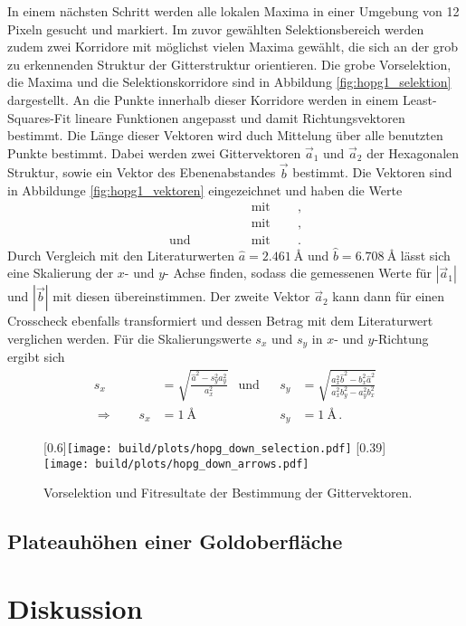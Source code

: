 In einem nächsten Schritt werden alle lokalen Maxima in einer Umgebung von
\num{12} Pixeln gesucht und markiert. Im zuvor gewählten Selektionsbereich
werden zudem zwei Korridore mit möglichst vielen Maxima gewählt, die sich an
der grob zu erkennenden Struktur der Gitterstruktur orientieren.
Die grobe Vorselektion, die Maxima und die Selektionskorridore sind in
Abbildung \ref{fig:hopg1_selektion} dargestellt.
An die Punkte innerhalb dieser Korridore werden in einem Least-Squares-Fit
lineare Funktionen angepasst und damit Richtungsvektoren bestimmt. Die Länge
dieser Vektoren wird duch Mittelung über alle benutzten Punkte bestimmt.
Dabei werden zwei Gittervektoren $\vec{a}_1$ und $\vec{a}_2$ der Hexagonalen
Struktur, sowie ein Vektor des Ebenenabstandes $\vec{b}$ bestimmt.
Die Vektoren sind in Abbildunge \ref{fig:hopg1_vektoren} eingezeichnet und
haben die Werte
\begin{align*}
     \qquad &\text{mit} \qquad
    \,,\\
     \qquad &\text{mit}\qquad
    \,,\\
    \text{und}\qquad \qquad &\text{mit}\qquad
    \,.
\end{align*}
Durch Vergleich mit den Literaturwerten \cite{HOPG_gittervektoren} $\hat{a}
= \SI{2.461}{\angstrom}$ und $\hat{b} = \SI{6.708}{\angstrom}$ lässt sich
eine Skalierung der $x$- und $y$- Achse finden, sodass die gemessenen Werte
für $\left|\vec{a}_1\right|$ und $\left|\vec{b}\right|$ mit diesen
übereinstimmen. Der zweite Vektor $\vec{a}_2$ kann dann für einen
Crosscheck ebenfalls transformiert und dessen Betrag mit dem Literaturwert
verglichen werden.
Für die Skalierungswerte $s_x$ und $s_y$ in $x$- und $y$-Richtung ergibt sich
\begin{align*}
    s_x &= \sqrt{\frac{\hat{a}^2 - s_y^2 a_y^2}
                      {a_x^2}}
                      &\text{und}&&
    s_y &= \sqrt{\frac{a_x^2\hat{b}^2 - b_x^2\hat{a}^2}
                                       {a_x^2 b_y^2 - a_y^2 b_x^2}}\\
    \Rightarrow\qquad
    s_x &= \SI{1}{\angstrom}
    &&&
    s_y &= \SI{1}{\angstrom}\,.
\end{align*}

\begin{figure}
    \centering
    [0.6\linewidth]{\texttt{[image: build/plots/hopg\_down\_selection.pdf]}}
    [0.39\linewidth]{\texttt{[image: build/plots/hopg\_down\_arrows.pdf]}}
    \caption{Vorselektion und Fitresultate der Bestimmung der Gittervektoren.}
    \label{fig:hopg_fit}
\end{figure}

\subsection{Plateauhöhen einer Goldoberfläche}
\label{subsec:gold}

\clearpage
\section{Diskussion}
\label{sec:diskussion}
